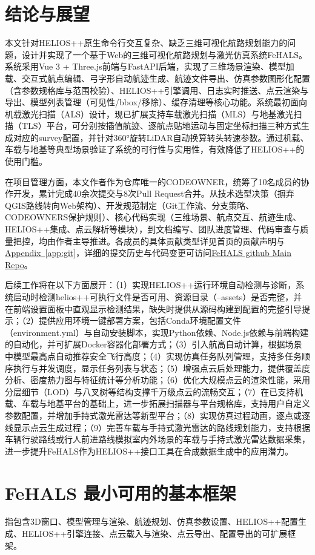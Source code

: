\documentclass[a4paper,fleqn]{cas-sc}
\newcommand{\refApp}[1]{\hyperref[#1]{Appendix~\ref*{#1}}}
\newcommand{\FeHALSRepo}{\href{https://github.com/WZYivan/FeHALS}{FeHALS github Main Repo}}
\begin{document}
\section{结论与展望}\label{sec:conclusion}
本文针对HELIOS++原生命令行交互复杂、缺乏三维可视化航路规划能力的问题，设计并实现了一个基于Web的三维可视化航路规划与激光仿真系统FeHALS。系统采用Vue 3 + Three.js前端与FastAPI后端，实现了三维场景渲染、模型加载、交互式航点编辑、弓字形自动航迹生成、航迹文件导出、仿真参数图形化配置（含参数规格库与范围校验）、HELIOS++引擎调用、日志实时推送、点云渲染与导出、模型列表管理（可见性/bbox/移除）、缓存清理等核心功能。系统最初面向机载激光扫描（ALS）设计，现已扩展支持车载激光扫描（MLS）与地基激光扫描（TLS）平台，可分别按插值航迹、逐航点贴地运动与固定坐标扫描三种方式生成对应的survey配置，并针对360°旋转LiDAR自动换算转头转速参数。通过机载、车载与地基等典型场景验证了系统的可行性与实用性，有效降低了HELIOS++的使用门槛。

在项目管理方面，本文作者作为仓库唯一的CODEOWNER，统筹了10名成员的协作开发，累计完成40余次提交与8次Pull Request合并。从技术选型决策（摒弃QGIS路线转向Web架构）、开发规范制定（Git工作流、分支策略、CODEOWNERS保护规则）、核心代码实现（三维场景、航点交互、航迹生成、HELIOS++集成、点云解析等模块），到文档编写、团队进度管理、代码审查与质量把控，均由作者主导推进。各成员的具体贡献类型详见首页的贡献声明与\refApp{app:git}，详细的提交历史与代码变更可访问\FeHALSRepo。

后续工作将在以下方面展开：（1）实现HELIOS++运行环境自动检测与诊断，系统启动时检测helios++可执行文件是否可用、资源目录（--assets）是否完整，并在前端设置面板中直观显示检测结果，缺失时提供从源码构建到配置的完整引导提示；（2）提供应用环境一键部署方案，包括Conda环境配置文件（environment.yml）与自动安装脚本，实现Python依赖、Node.js依赖与前端构建的自动化，并可扩展Docker容器化部署方式；（3）引入航高自动计算，根据场景中模型最高点自动推荐安全飞行高度；（4）实现仿真任务队列管理，支持多任务顺序执行与并发调度，显示任务列表与状态；（5）增强点云后处理能力，提供覆盖度分析、密度热力图与特征统计等分析功能；（6）优化大规模点云的渲染性能，采用分层细节（LOD）与八叉树等结构支撑千万级点云的流畅交互；（7）在已支持机载、车载与地基平台的基础上，进一步拓展扫描器与平台规格库，支持用户自定义参数配置，并增加手持式激光雷达等新型平台；（8）实现仿真过程动画，逐点或逐线显示点云生成过程；（9）完善车载与手持式激光雷达的路线规划能力，支持根据车辆行驶路线或行人前进路线模拟室内外场景的车载与手持式激光雷达数据采集，进一步提升FeHALS作为HELIOS++接口工具在合成数据生成中的应用潜力。

\printcredits
\section*{FeHALS 最小可用的基本框架}
指包含3D窗口、模型管理与渲染、航迹规划、仿真参数设置、HELIOS++配置生成、HELIOS++引擎连接、点云载入与渲染、点云导出、配置导出的可扩展框架。
\end{document}
